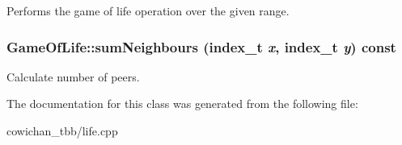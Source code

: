 Performs the game of life operation over the given range. \hypertarget{class_game_of_life_df162a0c6062460fa658ae9b9cd457b6}{
\subsubsection[{sumNeighbours}]{ GameOfLife::sumNeighbours ({\bf index\_\-t} {\em x}, \/  {\bf index\_\-t} {\em y}) const}}
\label{class_game_of_life_df162a0c6062460fa658ae9b9cd457b6}


Calculate number of peers. 

The documentation for this class was generated from the following file:\begin{CompactItemize}
\item 
cowichan\_\-tbb/life.cpp\end{CompactItemize}
